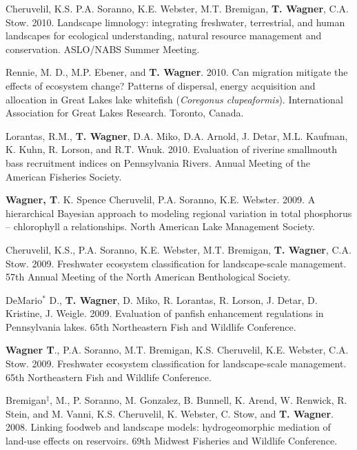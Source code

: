 \documentclass[10pt]{article}
\begin{document}
\begin{flushleft}
\begin{etaremune}
\item Cheruvelil, K.S. P.A. Soranno, K.E. Webster, M.T. Bremigan, {\bf T. Wagner}, C.A. Stow. 2010. Landscape limnology: integrating freshwater, terrestrial, and human landscapes for ecological understanding, natural resource management and conservation. ASLO/NABS Summer Meeting.

\item Rennie, M. D., M.P. Ebener, and {\bf T. Wagner}. 2010. Can migration mitigate the effects of ecosystem change? Patterns of dispersal, energy acquisition and allocation in Great Lakes lake whitefish (\emph{Coregonus clupeaformis}). International Association for Great Lakes Research. Toronto, Canada. 

\item Lorantas, R.M., {\bf T. Wagner}, D.A. Miko, D.A. Arnold, J. Detar, M.L. Kaufman, K. Kuhn, R. Lorson, and R.T. Wnuk. 2010. Evaluation of riverine smallmouth bass recruitment indices on Pennsylvania Rivers. Annual Meeting of the American Fisheries Society. 


\item {\bf Wagner, T}. K. Spence Cheruvelil, P.A. Soranno, K.E. Webster. 2009. A hierarchical Bayesian approach to modeling regional variation in total phosphorus – chlorophyll a relationships. North American Lake Management Society.

\item Cheruvelil, K.S., P.A. Soranno, K.E. Webster, M.T. Bremigan, {\bf T. Wagner}, C.A. Stow. 2009. Freshwater ecosystem classification for landscape-scale management. 57th Annual Meeting of the North American Benthological Society. 

\item DeMario$^*$ D., {\bf T. Wagner}, D. Miko, R. Lorantas, R. Lorson, J. Detar, D. Kristine, J. Weigle. 2009. Evaluation of panfish enhancement regulations in Pennsylvania lakes. 65th Northeastern Fish and Wildlife Conference.

\item {\bf Wagner T}., P.A. Soranno, M.T. Bremigan, K.S. Cheruvelil, K.E. Webster, C.A. Stow. 2009. Freshwater ecosystem classification for landscape-scale management. 65th Northeastern Fish and Wildlife Conference.


\item Bremigan$^\ddagger$, M., P. Soranno, M. Gonzalez,  B. Bunnell, K. Arend, W. Renwick, R. Stein, and M. Vanni, K.S. Cheruvelil, K. Webster, C. Stow, and {\bf T. Wagner}. 2008. Linking foodweb and landscape models: hydrogeomorphic mediation of land-use effects on reservoirs. 69th Midwest Fisheries and Wildlife Conference.


\end{etaremune}
\end{flushleft}
\end{document}
